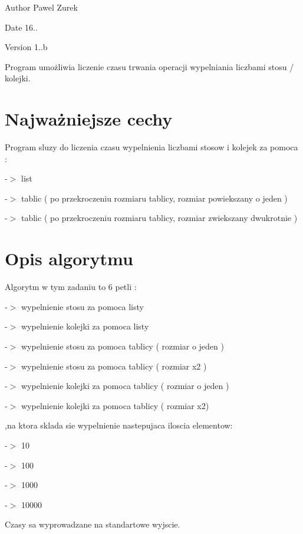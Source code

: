 \begin{DoxyAuthor}{Author}
Pawel Zurek 
\end{DoxyAuthor}
\begin{DoxyDate}{Date}
16.. 
\end{DoxyDate}
\begin{DoxyVersion}{Version}
1..\-b
\end{DoxyVersion}
Program umożliwia liczenie czasu trwania operacji wypelniania liczbami stosu / kolejki.\hypertarget{index_etykieta-wazne-cechy}{}\section{Najważniejsze cechy}\label{index_etykieta-wazne-cechy}
Program sluzy do liczenia czasu wypelnienia liczbami stosow i kolejek za pomoca \-:\par


\par
-\/$>$ list \par
-\/$>$ tablic ( po przekroczeniu rozmiaru tablicy, rozmiar powiekszany o jeden ) \par
-\/$>$ tablic ( po przekroczeniu rozmiaru tablicy, rozmiar zwiekszany dwukrotnie )\hypertarget{index_etykieta-op-algorytm}{}\section{Opis algorytmu}\label{index_etykieta-op-algorytm}
Algorytm w tym zadaniu to 6 petli \-: \par
-\/$>$ wypelnienie stosu za pomoca listy \par
-\/$>$ wypelnienie kolejki za pomoca listy \par
-\/$>$ wypelnienie stosu za pomoca tablicy ( rozmiar o jeden ) \par
-\/$>$ wypelnienie stosu za pomoca tablicy ( rozmiar x2 ) \par
-\/$>$ wypelnienie kolejki za pomoca tablicy ( rozmiar o jeden ) \par
-\/$>$ wypelnienie kolejki za pomoca tablicy ( rozmiar x2)

\par
,na ktora sklada sie wypelnienie nastepujaca iloscia elementow\-:

\par
-\/$>$ 10 \par
-\/$>$ 100 \par
-\/$>$ 1000 \par
-\/$>$ 10000

Czasy sa wyprowadzane na standartowe wyjscie. 
